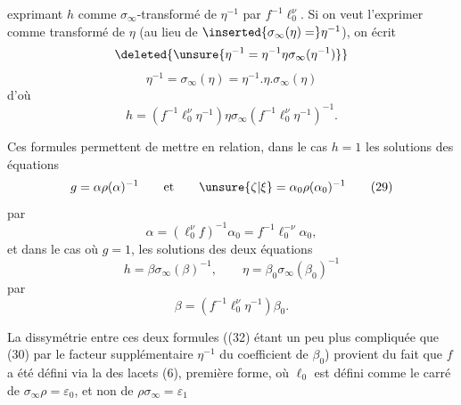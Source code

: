 
exprimant $h$ comme $\sigma_\infty$-transformé de $\eta^{-1}$ par $f^{-1}\ell_0^\nu$. Si on veut l'exprimer comme \inserted{$\sigma_\infty$-}transformé de $\eta$ (au lieu de $\inserted{\sigma_\infty(\eta)=}\eta^{-1}$), on écrit
\[
 \deleted{\unsure{\eta^{-1}=\eta^{-1}\eta\sigma_\infty(\eta^{-1})}}
\]
\[
 \eta^{-1}=\sigma_\infty(\eta)=\eta^{-1}.\eta.\sigma_\infty(\eta)
\]
d'où
\[
 h=(f^{-1}\ell_0^\nu\eta^{-1})\eta\sigma_\infty(f^{-1}\ell_0^\nu\eta^{-1})^{-1}.
 \tag{28bis}
\]

Ces formules permettent de mettre en relation, dans le cas $h=1$ les solutions des  équations
\[
 g=\alpha\rho(\alpha)^{-1}
 \qquad\text{et}\qquad
 \unsure{\zeta|\xi}=\alpha_0\rho(\alpha_0)^{-1}
 \tag{29}
\]
par
\[
 \alpha=(\ell_0^\nu f)^{-1}\alpha_0=f^{-1}\ell_0^{-\nu}\alpha_0,
 \tag{30}
\]
et dans le cas où $g=1$, les solutions des deux équations
\[
 h=\beta\sigma_\infty(\beta)^{-1},\qquad
 \eta=\beta_0\sigma_\infty(\beta_0)^{-1}
 \tag{31}
\]
par
\[
 \beta=(f^{-1}\ell_0^\nu\eta^{-1})\beta_0.
 \tag{32}
\]

La dissymétrie entre ces deux formules ((32) étant un peu plus compliquée que (30) par le facteur supplémentaire $\eta^{-1}$ du coefficient de $\beta_0$) provient du fait que $f$ a été défini via la  des lacets (6), première forme, où $\ell_0$ est défini comme le carré de $\sigma_\infty\rho=\varepsilon_0$, et non de $\rho\sigma_\infty=\varepsilon_1$


